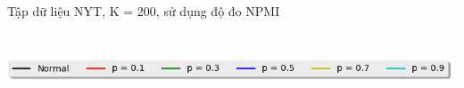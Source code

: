 \documentclass[pdf]{beamer}
\begin{document}
\begin{frame}{Tập dữ liệu NYT, K = 200, sử dụng độ đo NPMI }
\begin{columns}[T]
\begin{column}{.50\textwidth}
\begin{figure}
\end{figure}				
\end{column} %
\end{columns}
\begin{center}
\includegraphics[width=1\textwidth]{menu.png}	
\end{center}
\end{frame}
\end{document}
